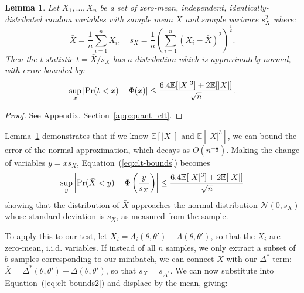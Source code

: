 \documentclass[letterpaper]{article}
\newcommand{\mE}{\mathbb{E}}
\newtheorem{lemma}{Lemma}
\begin{document}
\begin{lemma}\label{lem:quant_clt}
Let $X_1,\ldots,X_n$ be a set of zero-mean, independent, identically-distributed
random variables with sample mean $\bar{X}$ and sample variance $s^2_X$
where:
\begin{equation}
    \bar{X} = \frac{1}{n}\sum_{i=1}^nX_i, \quad s_X = \frac{1}{n}\left(\sum_{i=1}^n(X_i-\bar{X})^2\right)^{\frac{1}{2}}.
\end{equation}
Then the t-statistic $t=\bar{X}/s_X$ has a distribution which is approximately normal, with
error bounded by:
\begin{equation}\label{eq:clt-bounds}
    \sup_x|{\rm Pr}(t<x) - \Phi(x)| \leq \frac{6.4\mE[|X|^3]+2\mE[|X|]}{\sqrt{n}}.
\end{equation}
\end{lemma}

\begin{proof}
See Appendix, Section~\ref{app:quant_clt}.
\end{proof}

Lemma~\ref{lem:quant_clt} demonstrates that if we know $\mE[|X|]$ and
$\mE[|X|^3]$, we can bound the error of the normal approximation, which decays
as $O(n^{-\frac{1}{2}})$. Making the change of variables $y = x s_X$,
Equation~(\ref{eq:clt-bounds}) becomes
\begin{equation}\label{eq:clt-bounds2}
   \sup_y\left|{\rm Pr}(\bar{X}< y) - \Phi\left(\frac{y}{s_X}\right)\right| \leq
   \frac{6.4\mE[|X|^3]+2\mE[|X|]}{\sqrt{n}}
\end{equation}
showing that the distribution of $\bar{X}$ approaches the normal distribution
$\mathcal{N}(0,s_X)$ whose standard deviation is $s_X$, as measured
from the sample.

To apply this to our test, let $X_i = \Lambda_i(\theta,\theta') -
\Lambda(\theta,\theta')$, so that the $X_i$ are zero-mean, i.i.d. variables. If
instead of all $n$ samples, we only extract a subset of $b$ samples
corresponding to our minibatch, we can connect $\bar{X}$ with our $\Delta^*$
term: $\bar{X} = \Delta^*(\theta,\theta') - \Delta(\theta,\theta')$, so that
$s_X = s_{\Delta^*}$. We can now substitute into Equation~(\ref{eq:clt-bounds2})
and displace by the mean, giving:
\end{document}
